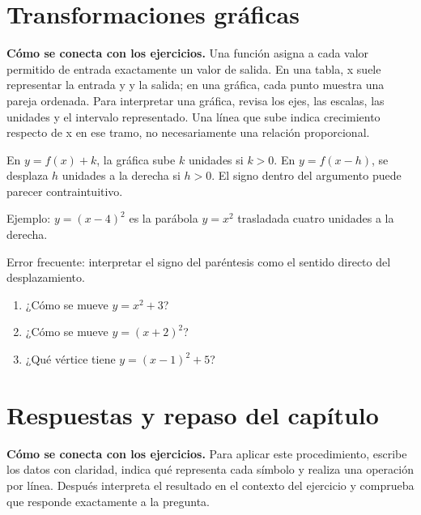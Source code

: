 \documentclass[10pt,oneside,openany]{book}
\begin{document}
\section{Transformaciones gráficas}

\textbf{Cómo se conecta con los ejercicios.} Una función asigna a cada valor permitido de entrada exactamente un valor de salida. En una tabla, x suele representar la entrada y y la salida; en una gráfica, cada punto muestra una pareja ordenada. Para interpretar una gráfica, revisa los ejes, las escalas, las unidades y el intervalo representado. Una línea que sube indica crecimiento respecto de x en ese tramo, no necesariamente una relación proporcional.

En $y=f(x)+k$, la gráfica sube $k$ unidades si $k>0$. En $y=f(x-h)$, se desplaza $h$ unidades a la derecha si $h>0$. El signo dentro del argumento puede parecer contraintuitivo.

\begin{ejemplo}
Ejemplo: $y=(x-4)^2$ es la parábola $y=x^2$ trasladada cuatro unidades a la derecha.
\end{ejemplo}

\begin{ojo}
Error frecuente: interpretar el signo del paréntesis como el sentido directo del desplazamiento.
\end{ojo}

\begin{practica}

\begin{enumerate}

\item ¿Cómo se mueve $y=x^2+3$?

\item ¿Cómo se mueve $y=(x+2)^2$?

\item ¿Qué vértice tiene $y=(x-1)^2+5$?

\end{enumerate}

\end{practica}



\section{Respuestas y repaso del capítulo}

\textbf{Cómo se conecta con los ejercicios.} Para aplicar este procedimiento, escribe los datos con claridad, indica qué representa cada símbolo y realiza una operación por línea. Después interpreta el resultado en el contexto del ejercicio y comprueba que responde exactamente a la pregunta.
\end{document}
